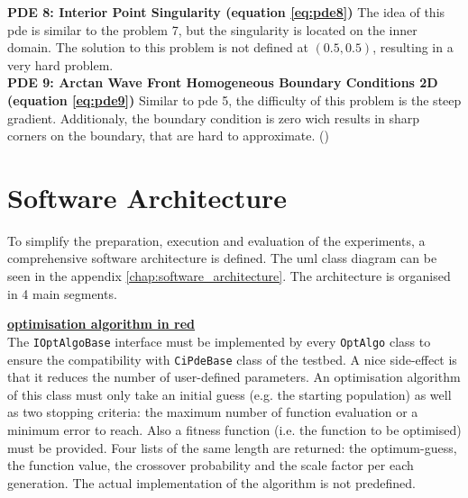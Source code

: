 \documentclass[./\jobname.tex]{subfiles}
\begin{document}
\textbf{PDE 8: Interior Point Singularity (equation \ref{eq:pde8})} The idea of this \gls{pde} is similar to the problem 7, but the singularity is located on the inner domain. The solution to this problem is not defined at $(0.5, 0.5)$, resulting in a very hard problem. \\

\textbf{PDE 9: Arctan Wave Front Homogeneous Boundary Conditions 2D (equation \ref{eq:pde9})} Similar to \gls{pde} 5, the difficulty of this problem is the steep gradient. Additionaly, the boundary condition is zero wich results in sharp corners on the boundary, that are hard to approximate. (\cite{mitchell_nist_2018})\\


\section{Software Architecture}



To simplify the preparation, execution and evaluation of the experiments, a comprehensive software architecture is defined. The \gls{uml} class diagram can be seen in the appendix \ref{chap:software_architecture}. The architecture is organised in 4 main segments. 

\textcolor{opt_algo_colour}{\large \underline{\textbf{optimisation algorithm in red}}} \\
The \colorbox{light-gray}{\lstinline[basicstyle=\ttfamily\color{black}]|IOptAlgoBase|} interface must be implemented by every \colorbox{light-gray}{\lstinline[basicstyle=\ttfamily\color{black}]|OptAlgo|} class to ensure the compatibility with \colorbox{light-gray}{\lstinline[basicstyle=\ttfamily\color{black}]|CiPdeBase|} class of the testbed. A nice side-effect is that it reduces the number of user-defined parameters. An optimisation algorithm of this class must only take an initial guess (e.g. the starting population) as well as two stopping criteria: the maximum number of function evaluation or a minimum error to reach. Also a fitness function (i.e. the function to be optimised) must be provided. Four lists of the same length are returned: the optimum-guess, the function value, the crossover probability and the scale factor per each generation. The actual implementation of the algorithm is not predefined. 
\end{document}
